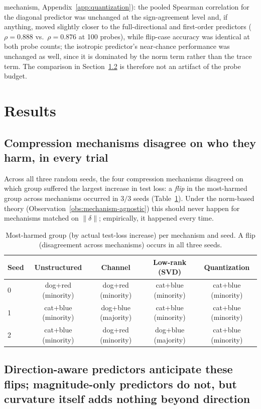 \documentclass{article}
\begin{document}
mechanism, Appendix~\ref{app:quantization}): the pooled Spearman correlation for the diagonal predictor was unchanged at the sign-agreement level and, if anything, moved slightly closer to the full-directional and first-order predictors ($\rho=0.888$ vs.\ $\rho=0.876$ at 100 probes), while flip-case accuracy was identical at both probe counts; the isotropic predictor's near-chance performance was unchanged as well, since it is dominated by the norm term rather than the trace term. The comparison in Section~\ref{sec:baseline-comparison} is therefore not an artifact of the probe budget.

\section{Results}
\label{sec:results}

\subsection{Compression mechanisms disagree on who they harm, in every trial}

Across all three random seeds, the four compression mechanisms disagreed on which group suffered the largest increase in test loss: a \emph{flip} in the most-harmed group across mechanisms occurred in $3/3$ seeds (Table~\ref{tab:flips}). Under the norm-based theory (Observation~\ref{obs:mechanism-agnostic}) this should never happen for mechanisms matched on $\|\delta\|$; empirically, it happened every time.

\begin{table}[t]
\centering
\caption{Most-harmed group (by actual test-loss increase) per mechanism and seed. A flip (disagreement across mechanisms) occurs in all three seeds.}
\label{tab:flips}
\begin{tabular}{@{}lcccc@{}}
\toprule
Seed & Unstructured & Channel & Low-rank (SVD) & Quantization \\
\midrule
0 & dog+red (minority)  & dog+red (minority)  & cat+blue (minority) & cat+blue (minority) \\
1 & cat+blue (minority) & dog+blue (majority) & cat+blue (minority) & cat+blue (minority) \\
2 & cat+blue (minority) & dog+red (minority)  & dog+blue (majority) & cat+blue (minority) \\
\bottomrule
\end{tabular}
\end{table}

\subsection{Direction-aware predictors anticipate these flips; magnitude-only predictors do not, but curvature itself adds nothing beyond direction}
\label{sec:baseline-comparison}
\end{document}
